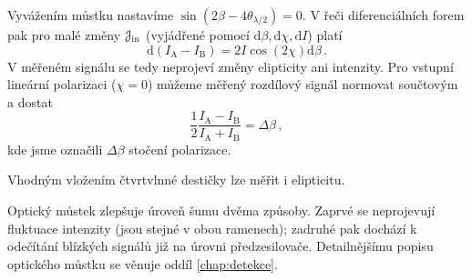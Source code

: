 Vyvážením můstku nastavíme $\sin(2\beta-4\theta_{\lambda/2})=0$. 
V řeči diferenciálních forem pak pro malé změny $\mathcal{J}_\textrm{in}$ (vyjádřené pomocí $\textrm{d}\beta, \textrm{d}\chi, \textrm{d}I$) platí
\begin{equation}
\label{eqn:A-B-mustek}
    \textrm{d}(I_\textrm{A}-I_\textrm{B})=2I\cos(2\chi) \textrm{d}\beta \,.
\end{equation}
V měřeném signálu se tedy neprojeví změny elipticity ani intenzity.
Pro vstupní lineární polarizaci ($\chi=0$) můžeme měřený rozdílový signál normovat součtovým a dostat
\begin{equation}
    \frac{1}{2}\frac{I_\textrm{A}-I_\textrm{B}}{I_\textrm{A}+I_\textrm{B}}=\Delta\beta \,,
\end{equation}
kde jsme označili $\Delta\beta$ stočení polarizace.

Vhodným vložením čtvrtvlnné destičky lze měřit i elipticitu\cite{silberQuadraticMagnetoopticKerr2019a}.

Optický můstek zlepšuje úroveň šumu dvěma způsoby.
Zaprvé se neprojevují fluktuace intenzity (jsou stejné v obou ramenech); zadruhé pak dochází k odečítání blízkých signálů již na úrovni předzesilovače.
Detailnějšímu popisu optického můstku se věnuje oddíl \ref{chap:detekce}.

